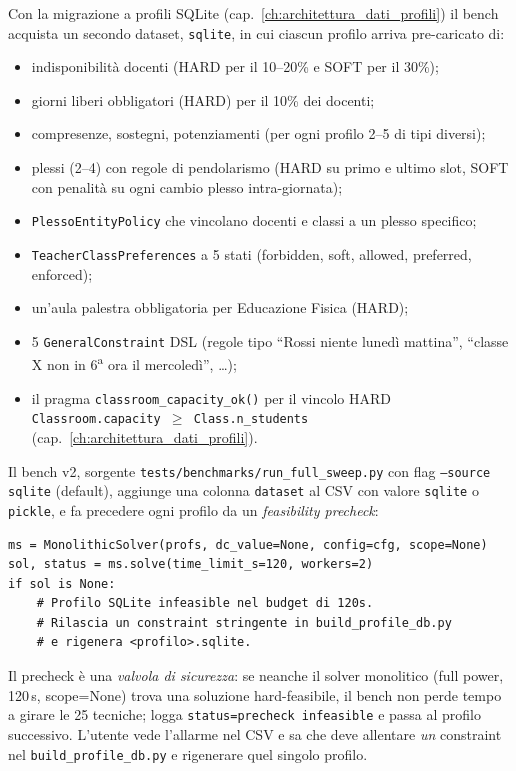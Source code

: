 Con la migrazione a profili SQLite (cap.~\ref{ch:architettura_dati_profili})
il bench acquista un secondo dataset, \texttt{sqlite}, in cui
ciascun profilo arriva pre-caricato di:

\begin{itemize}
\item indisponibilit\`a docenti (HARD per il 10--20\% e SOFT per
  il 30\%);
\item giorni liberi obbligatori (HARD) per il 10\% dei docenti;
\item compresenze, sostegni, potenziamenti (per ogni profilo
  2--5 di tipi diversi);
\item plessi (2--4) con regole di pendolarismo (HARD su primo e
  ultimo slot, SOFT con penalit\`a su ogni cambio plesso
  intra-giornata);
\item \texttt{PlessoEntityPolicy} che vincolano docenti e
  classi a un plesso specifico;
\item \texttt{TeacherClassPreferences} a 5 stati (forbidden,
  soft, allowed, preferred, enforced);
\item un'aula palestra obbligatoria per Educazione Fisica
  (HARD);
\item 5 \texttt{GeneralConstraint} DSL (regole tipo ``Rossi
  niente luned\`i mattina'', ``classe X non in 6\textsuperscript{a}
  ora il mercoled\`i'', \dots);
\item il pragma \texttt{classroom\_capacity\_ok()} per il
  vincolo HARD \texttt{Classroom.capacity $\ge$ Class.n\_students}
  (cap.~\ref{ch:architettura_dati_profili}).
\end{itemize}

Il bench v2, sorgente \texttt{tests/benchmarks/run\_full\_sweep.py}
con flag \texttt{--source sqlite} (default), aggiunge una
colonna \texttt{dataset} al CSV con valore \texttt{sqlite} o
\texttt{pickle}, e fa precedere ogni profilo da un
\emph{feasibility precheck}:

\begin{lstlisting}[style=py,basicstyle=\ttfamily\small]
ms = MonolithicSolver(profs, dc_value=None, config=cfg, scope=None)
sol, status = ms.solve(time_limit_s=120, workers=2)
if sol is None:
    # Profilo SQLite infeasible nel budget di 120s.
    # Rilascia un constraint stringente in build_profile_db.py
    # e rigenera <profilo>.sqlite.
\end{lstlisting}

Il precheck \`e una \emph{valvola di sicurezza}: se neanche il
solver monolitico (full power, 120\,s, scope=None) trova una
soluzione hard-feasibile, il bench non perde tempo a girare le
25 tecniche; logga \texttt{status=precheck infeasible} e passa
al profilo successivo. L'utente vede l'allarme nel CSV e sa
che deve allentare \emph{un} constraint nel
\texttt{build\_profile\_db.py} e rigenerare quel singolo
profilo.

